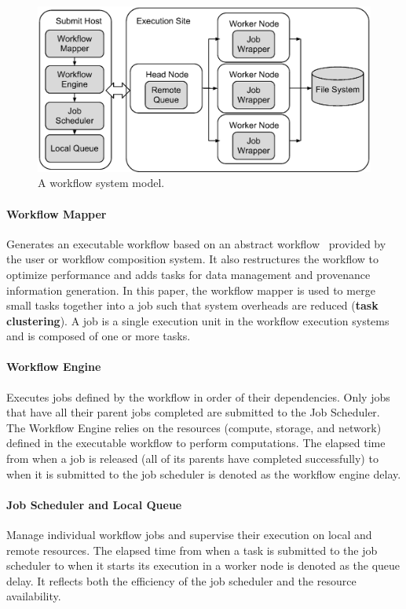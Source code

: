 \documentclass[final,5p,times,twocolumn]{elsarticle}
\begin{document}
\begin{figure}[!htb]
\centering
  \includegraphics[width=0.95\linewidth]{figure1.eps}
  \caption{A workflow system model.}
  \label{fig:model_system}
\end{figure}

\paragraph{Workflow Mapper} Generates an executable workflow based on an abstract workflow~\cite{Deelman2004} provided by the user or workflow composition system. It also restructures the workflow to optimize performance and adds tasks for data management and provenance information generation. In this paper, the workflow mapper is used to merge small tasks together into a job such that system overheads are reduced (\textbf{task clustering}). A job is a single execution unit in the workflow execution systems and is composed of one or more tasks. 


\paragraph{Workflow Engine} Executes jobs defined by the workflow in order of their dependencies. Only jobs that have all their parent jobs completed are submitted to the Job Scheduler. The Workflow Engine relies on the resources (compute, storage, and network) defined in the executable workflow to perform computations. The elapsed time from when a job is released (all of its parents have completed successfully) to when it is submitted to the job scheduler is denoted as the workflow engine delay. %

\paragraph{Job Scheduler and Local Queue} Manage individual workflow jobs and supervise their execution on local and remote resources. The elapsed time from when a task is submitted to the job scheduler to when it starts its execution in a worker node is denoted as the queue delay. It reflects both the efficiency of the job scheduler and the resource availability. 
\end{document}
